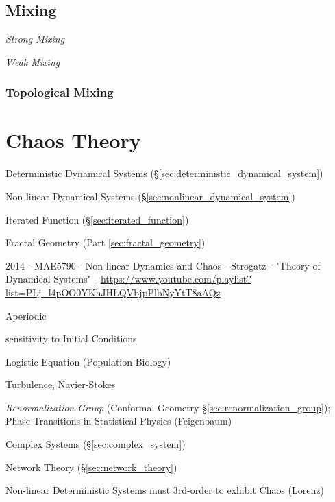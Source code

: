 \subsection{Mixing}\label{sec:mixing}

\emph{Strong Mixing}

\emph{Weak Mixing}



\subsubsection{Topological Mixing}\label{sec:topological_mixing}



\section{Chaos Theory}\label{sec:chaos_theory}

Deterministic Dynamical Systems (\S\ref{sec:deterministic_dynamical_system})

Non-linear Dynamical Systems (\S\ref{sec:nonlinear_dynamical_system})

Iterated Function (\S\ref{sec:iterated_function})

Fractal Geometry (Part \ref{sec:fractal_geometry})

2014 - MAE5790 - Non-linear Dynamics and Chaos - Strogatz - "Theory of
Dynamical Systems" -
\url{https://www.youtube.com/playlist?list=PLj_l4pOO0YKhJHLQVbjpPlbNyYtT8aAQz}

Aperiodic

sensitivity to Initial Conditions

Logistic Equation (Population Biology)

Turbulence, Navier-Stokes

\emph{Renormalization Group} (Conformal Geometry
\S\ref{sec:renormalization_group}); Phase Transitions in Statistical Physics
(Feigenbaum)

Complex Systems (\S\ref{sec:complex_system})

Network Theory (\S\ref{sec:network_theory})

Non-linear Deterministic Systems must 3rd-order to exhibit Chaos (Lorenz)

